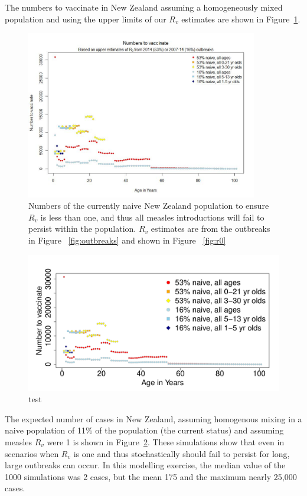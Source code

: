 \documentclass{article}
\begin{document}
The numbers to vaccinate in New Zealand assuming a homogeneously mixed population and using the upper limits of our $R_v$ estimates are shown in Figure~\ref{fig:numvacc}.

\begin{figure}
     \centering
     \includegraphics[width=0.9\textwidth]{NumbersToVaccinate.pdf}
     \caption{Numbers of the currently naive New Zealand population to ensure $R_v$ is less than one, and thus all measles introductions will fail to persist within the population. $R_v$ estimates are from the outbreaks in Figure ~\ref{fig:outbreaks} and shown in Figure ~\ref{fig:r0}}
     \label{fig:numvacc}
\end{figure}



\begin{figure}
     \centering
\includegraphics{interimreport2-034}
     \caption{test}
     \label{fig:sim}
\end{figure}

The expected number of cases in New Zealand, assuming homogenous mixing in a naive population of 11\% of the population (the current status) and assuming measles $R_v$ were 1 is shown in Figure~\ref{fig:sim}. These simulations show that even in scenarios when $R_v$ is one and thus stochastically should fail to persist for long, large outbreaks can occur. In this modelling exercise, the median value of the 1000 simulations was 2 cases, but the mean 175 and the maximum nearly 25,000 cases.
\end{document}
